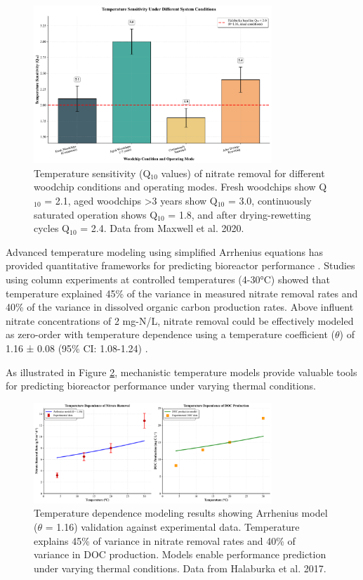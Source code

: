 \documentclass[12pt,a4paper]{article}
\begin{document}
\begin{figure}[H]
\centering
\includegraphics[width=0.8\textwidth]{fig4_temperature_scientific}
\caption{Temperature sensitivity (Q$_{10}$ values) of nitrate removal for different woodchip conditions and operating modes. Fresh woodchips show Q$_{10}$ = 2.1, aged woodchips >3 years show Q$_{10}$ = 3.0, continuously saturated operation shows Q$_{10}$ = 1.8, and after drying-rewetting cycles Q$_{10}$ = 2.4. Data from Maxwell et al. 2020.}
\label{fig:temperature_sensitivity}
\end{figure}

Advanced temperature modeling using simplified Arrhenius equations has provided quantitative frameworks for predicting bioreactor performance \citep{RN242}. Studies using column experiments at controlled temperatures (4-30°C) showed that temperature explained 45\% of the variance in measured nitrate removal rates and 40\% of the variance in dissolved organic carbon production rates. Above influent nitrate concentrations of 2 mg-N/L, nitrate removal could be effectively modeled as zero-order with temperature dependence using a temperature coefficient ($\theta$) of 1.16 ± 0.08 (95\% CI: 1.08-1.24) \citep{RN242}.

As illustrated in Figure \ref{fig:temperature_modeling}, mechanistic temperature models provide valuable tools for predicting bioreactor performance under varying thermal conditions.

\begin{figure}[H]
\centering
\includegraphics[width=0.8\textwidth]{fig10_temperature_modeling_scientific}
\caption{Temperature dependence modeling results showing Arrhenius model ($\theta$ = 1.16) validation against experimental data. Temperature explains 45\% of variance in nitrate removal rates and 40\% of variance in DOC production. Models enable performance prediction under varying thermal conditions. Data from Halaburka et al. 2017.}
\label{fig:temperature_modeling}
\end{figure}
\end{document}

